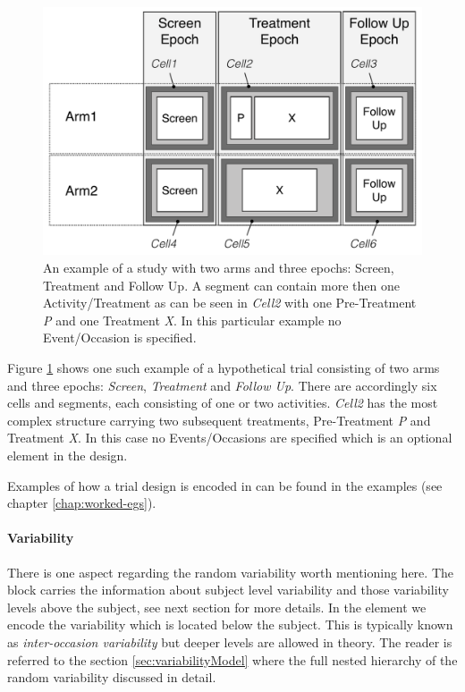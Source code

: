 \begin{figure}[htb]
\centering
\includegraphics[height=0.375\textheight]{pics/templateTrialDesign.pdf}%
\caption{An example of a study with two arms and three epochs: Screen,
Treatment and Follow Up. A segment can contain more then one Activity/Treatment
as can be seen in \emph{Cell2} with one Pre-Treatment \emph{P} and one Treatment \emph{X}.
In this particular example no Event/Occasion is specified.}
\label{fig:templateTrialDesign}
\end{figure}
Figure \ref{fig:templateTrialDesign} shows one such example of a hypothetical trial
consisting of two arms and three epochs: \emph{Screen}, \emph{Treatment} and
\emph{Follow Up}. There are accordingly six cells and segments, each consisting of one
or two activities. \emph{Cell2} has the most complex structure carrying two
subsequent treatments, Pre-Treatment \emph{P} and Treatment \emph{X}. In this case
no Events/Occasions are specified which is an optional element in the design.

Examples of how a trial design is encoded in \pharmml can be found in
the examples (see chapter \ref{chap:worked-egs}).

\paragraph{Variability}
There is one aspect regarding the random variability worth mentioning
here. The  block carries the information about subject 
level variability and those variability levels above the subject, see next section for more details.  
In the  element we encode the variability which is located below the
subject. This is typically known as \textit{inter-occasion variability} but deeper levels
are allowed in theory. The reader is referred to the section \ref{sec:variabilityModel} where the 
full nested hierarchy of the random variability discussed in detail.


